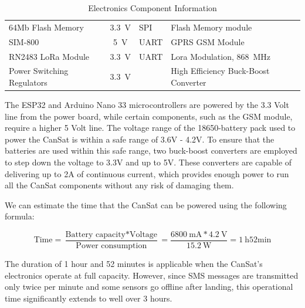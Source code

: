 \documentclass[11pt]{article}
\begin{document}
\begin{table}[htbp]
\begin{tabularx}{0.95\textwidth}{>{\raggedright\arraybackslash}p{3.5cm}c>{\raggedright\arraybackslash}X>{\raggedright\arraybackslash}p{5.5cm}}
64Mb Flash Memory & \SI{3.3}{\volt} & SPI & Flash Memory module \\ %
\rowcolor{LightCyan1!50}SIM-800 & \SI{5}{\volt} & UART & GPRS GSM Module \\ %
RN2483 LoRa Module& \SI{3.3}{\volt} & UART & Lora Modulation, \SI{868}{\mega\hertz} \\ %
\rowcolor{LightCyan1!50}Power Switching Regulators & \SI{3.3}{\volt} & & High Efficiency Buck-Boost Converter  \\ %
\end{tabularx}
\caption{\small{Electronics Component Information}}
\end{table}

The ESP32 and Arduino Nano 33 microcontrollers are powered by the 3.3 Volt line from the power board, while certain components, such as the GSM module, require a higher 5 Volt line. The voltage range of the 18650-battery pack used to power the CanSat is within a safe range of 3.6V - 4.2V. To ensure that the batteries are used within this safe range, two buck-boost converters are employed to step down the voltage to 3.3V and up to 5V. These converters are capable of delivering up to 2A of continuous current, which provides enough power to run all the CanSat components without any risk of damaging them.

We can estimate the time that the CanSat can be powered using the following formula:

\begin{equation*}
\text{Time} = \frac{\text{Battery capacity} * \text{Voltage}}{\text{Power consumption}}=\frac{\SI{6800}{\milli\ampere} * \SI{4.2}{\volt}}{\SI{15.2}{\watt}} = \SI{1}{\hour}52\text{min}
\end{equation*}

The duration of 1 hour and 52 minutes is applicable when the CanSat's electronics operate at full capacity. However, since SMS messages are transmitted only twice per minute and some sensors go offline after landing, this operational time significantly extends to well over 3 hours.
\end{document}
